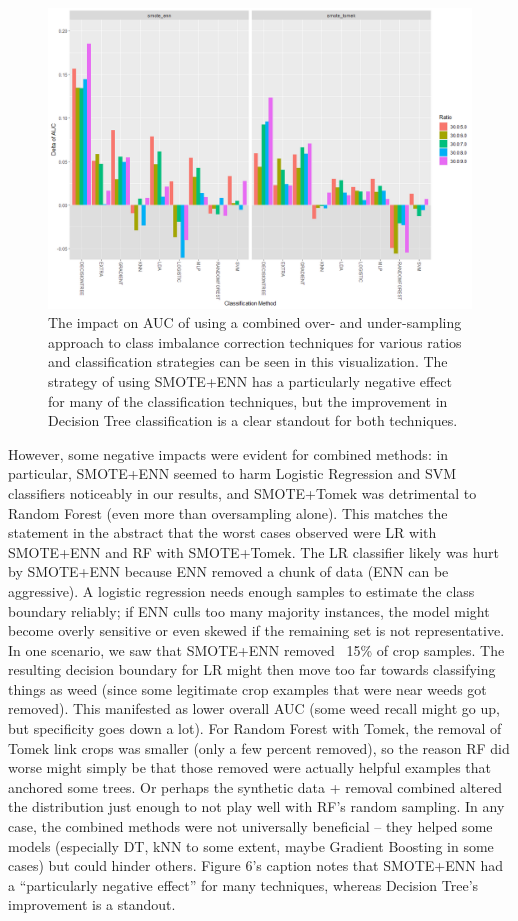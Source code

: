 \documentclass[agriengineering,article,submit,pdftex,moreauthors]{Definitions/mdpi}
\begin{document}
\begin{figure}[H]
	\centering
	\includegraphics[width=0.9\linewidth]{./figures/combined.png}
	\caption[Combined Over and Under-sampling]{The impact on AUC of using a combined over- and under-sampling approach to class imbalance correction techniques for various ratios and classification strategies can be seen in this visualization. The strategy of using SMOTE+ENN has a particularly negative effect for many of the classification techniques, but the improvement in Decision Tree classification is a clear standout for both techniques.}
	\label{fig:combined}
\end{figure}


However, some negative impacts were evident for combined methods: in particular, SMOTE+ENN seemed to harm Logistic Regression and SVM classifiers noticeably in our results, and SMOTE+Tomek was detrimental to Random Forest (even more than oversampling alone). This matches the statement in the abstract that the worst cases observed were LR with SMOTE+ENN and RF with SMOTE+Tomek. The LR classifier likely was hurt by SMOTE+ENN because ENN removed a chunk of data (ENN can be aggressive). A logistic regression needs enough samples to estimate the class boundary reliably; if ENN culls too many majority instances, the model might become overly sensitive or even skewed if the remaining set is not representative. In one scenario, we saw that SMOTE+ENN removed ~15\% of crop samples. The resulting decision boundary for LR might then move too far towards classifying things as weed (since some legitimate crop examples that were near weeds got removed). This manifested as lower overall AUC (some weed recall might go up, but specificity goes down a lot). For Random Forest with Tomek, the removal of Tomek link crops was smaller (only a few percent removed), so the reason RF did worse might simply be that those removed were actually helpful examples that anchored some trees. Or perhaps the synthetic data + removal combined altered the distribution just enough to not play well with RF’s random sampling. In any case, the combined methods were not universally beneficial – they helped some models (especially DT, kNN to some extent, maybe Gradient Boosting in some cases) but could hinder others. Figure 6’s caption notes that SMOTE+ENN had a “particularly negative effect” for many techniques, whereas Decision Tree’s improvement is a standout.
\end{document}
